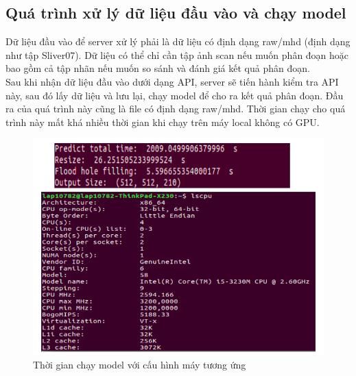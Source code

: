 \subsection{Quá trình xử lý dữ liệu đầu vào và chạy model}
Dữ liệu đầu vào để server xử lý phải là dữ liệu có định dạng raw/mhd (định dạng như tập Sliver07). Dữ liệu có thể chỉ cần tập ảnh scan nếu muốn phân đoạn hoặc bao gồm cả tập nhãn nếu muốn so sánh và đánh giá kết quả phân đoạn.\\
Sau khi nhận dữ liệu đầu vào dưới dạng API, server sẽ tiến hành kiểm tra API này, sau đó lấy dữ liệu và lưu lại, chạy model để cho ra kết quả phân đoạn. Đầu ra của quá trình này cũng là file có định dạng raw/mhd. Thời gian chạy cho quá trình này mất khá nhiều thời gian khi chạy trên máy local không có GPU.
\begin{figure}[h]
\centering
    \includegraphics[totalheight=7cm]{Images/app_configuration.png}
    \caption{Thời gian chạy model với cấu hình máy tương ứng}
    \label{skip_conn}
\end{figure}
